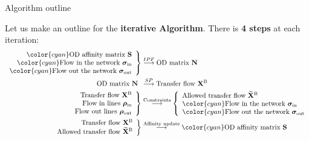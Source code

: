 \documentclass[10pt]{beamer}
\newcommand{\imp}[1]{\textbf{\color{cyan}#1}}
\begin{document}
	
	\begin{frame}{Algorithm outline}
		
		Let us make an outline for the \imp{iterative Algorithm}. There is \imp{4 steps} at each iteration: \\
		\footnotesize
		\begin{align}
			\left. \begin{array}{r} 
				{\color{cyan} \text{OD affinity matrix } \mathbf{S}} \\
				{\color{cyan} \text{Flow in the network } \bm{\sigma}_\text{in}} \\
				{\color{cyan} \text{Flow out the network } \bm{\sigma}_\text{out}}
			\end{array} \right\}  &\overset{IPF}{\longrightarrow} \text{OD matrix } \mathbf{N} \\
			\begin{array}{r}
			\text{OD matrix } \mathbf{N}
			\end{array} &\overset{SP}{\longrightarrow} \text{Transfer flow } \mathbf{X}^\text{B} \\
			\left. \begin{array}{r} 
			\text{Transfer flow } \mathbf{X}^\text{B} \\
			\text{Flow in lines } \bm{\rho}_\text{in} \\
			\text{Flow out lines } \bm{\rho}_\text{out}
			\end{array} \right\}  &\overset{\text{Constraints}}{\longrightarrow} 
			\left\{ \begin{array}{l}
			\text{Allowed transfer flow } \widetilde{\mathbf{X}}^\text{B} \\
			{\color{cyan} \text{Flow in the network } \bm{\sigma}_\text{in}} \\
			{\color{cyan} \text{Flow out the network } \bm{\sigma}_\text{out}}
			\end{array} \right. \\
			\left. \begin{array}{r} 
			\text{Transfer flow } \mathbf{X}^\text{B} \\
			 \text{Allowed transfer flow } \widetilde{\mathbf{X}}^\text{B}
			\end{array} \right\}  &\overset{\text{Affinity update}}{\longrightarrow} {\color{cyan} \text{OD affinity matrix } \mathbf{S}}
		\end{align}	
	\end{frame}
	
\end{document}
